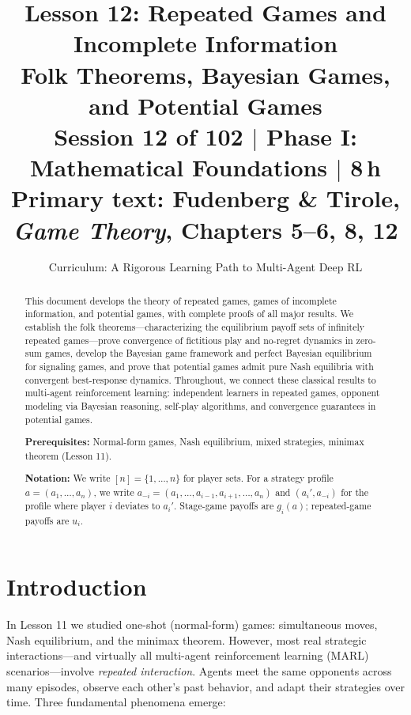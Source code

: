 \documentclass[11pt,a4paper]{article}
\title{\textbf{Lesson 12: Repeated Games and Incomplete Information}\\[10pt]
\large Folk Theorems, Bayesian Games, and Potential Games\\[5pt]
\normalsize Session 12 of 102 $\mid$ Phase I: Mathematical Foundations $\mid$ 8\,h\\
\normalsize Primary text: Fudenberg \& Tirole, \emph{Game Theory}, Chapters 5--6, 8, 12}
\author{Curriculum: A Rigorous Learning Path to Multi-Agent Deep RL}
\date{}
\theoremstyle{definition}
\theoremstyle{plain}
\theoremstyle{remark}
\begin{document}
\maketitle

\begin{abstract}
This document develops the theory of repeated games, games of incomplete information,
and potential games, with complete proofs of all major results. We establish the folk
theorems---characterizing the equilibrium payoff sets of infinitely repeated games---prove
convergence of fictitious play and no-regret dynamics in zero-sum games, develop the
Bayesian game framework and perfect Bayesian equilibrium for signaling games, and
prove that potential games admit pure Nash equilibria with convergent best-response
dynamics. Throughout, we connect these classical results to multi-agent reinforcement
learning: independent learners in repeated games, opponent modeling via Bayesian reasoning,
self-play algorithms, and convergence guarantees in potential games.

\medskip\noindent
\textbf{Prerequisites:} Normal-form games, Nash equilibrium, mixed strategies, minimax
theorem (Lesson 11).

\medskip\noindent
\textbf{Notation:} We write $[n] = \{1, \ldots, n\}$ for player sets. For a strategy
profile $a = (a_1, \ldots, a_n)$, we write $a_{-i} = (a_1, \ldots, a_{i-1}, a_{i+1},
\ldots, a_n)$ and $(a_i', a_{-i})$ for the profile where player $i$ deviates to $a_i'$.
Stage-game payoffs are $g_i(a)$; repeated-game payoffs are $u_i$.
\end{abstract}

\tableofcontents
\newpage

\section{Introduction}
\label{sec:introduction}

In Lesson 11 we studied one-shot (normal-form) games: simultaneous moves, Nash
equilibrium, and the minimax theorem. However, most real strategic interactions---and
virtually all multi-agent reinforcement learning (MARL) scenarios---involve \emph{repeated
interaction}. Agents meet the same opponents across many episodes, observe each other's
past behavior, and adapt their strategies over time. Three fundamental phenomena emerge:
\end{document}

